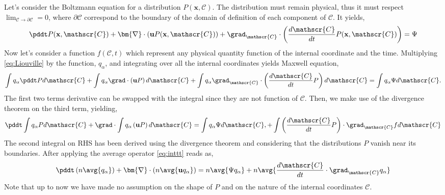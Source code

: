 Let's consider the Boltzmann equation for a distribution $P(\textbf{x},\mathscr{C})$.
The distribution must remain physical, thus it must respect $\lim_{\mathscr{C} \rightarrow \partial\mathscr{C}} = 0$, where $\partial \mathscr{C}$ correspond to the boundary of the domain of definition of each component of $\mathscr{C}$. 
It yields, 
\begin{equation}
    \label{eq:Liouville}
    \pddt P(\textbf{x},\mathscr{C})
    + \bm{\nabla} \cdot \left(\textbf{u} P(\textbf{x},\mathscr{C})\right)
    + \grad_\mathscr{C} \cdot \left(\frac{d\mathscr{C}}{dt} P(\textbf{x},\mathscr{C})\right) 
    = \Psi
\end{equation}
Now let's consider a function $f(\mathscr{C},t)$ which represent any physical quantity function of the internal coordinate and the time. 
Multiplying \ref{eq:Liouville} by the function, $q_\alpha$, and integrating over all the internal coordinates yields Maxwell equation,
\begin{equation}
    \int q_\alpha \pddt P d\mathscr{C}
    + \int q_\alpha \grad \cdot \left(\textbf{u} P\right)d\mathscr{C}
    + \int q_\alpha \grad_\mathscr{C} \cdot \left(\frac{d\mathscr{C}}{dt} P\right) d\mathscr{C} = \int q_\alpha \Psi d\mathscr{C}.
\end{equation}
The first two terms derivative can be swapped with the integral since they are not function of $\mathscr{C}$.
Then, we make use of the divergence theorem on the third term, 
yielding,
\begin{multline}
    \pddt \int q_\alpha  P d\mathscr{C}
    + \grad \cdot\int q_\alpha \left(\textbf{u} P\right)d\mathscr{C} 
    = \int q_\alpha \Psi d\mathscr{C},
    +\int \left(\frac{d\mathscr{C}}{dt} P\right) \cdot \grad_\mathscr{C} f  d\mathscr{C} 
    \label{eq:inttt}
\end{multline}
The second integral on RHS has been derived using the divergence theorem and considering that the distributions $P$ vanish near its boundaries. 
After applying the average operator \ref{eq:inttt} reads as,
\begin{equation}
    \pddt \left( n \avg{q_\alpha}\right)
    + \bm{\nabla} \cdot \left(n \avg{\textbf{u} q_\alpha}\right)
    = n \avg{\Psi q_\alpha}
    + n  \avg{\frac{d\mathscr{C}}{dt} \cdot \grad_\mathscr{C} q_\alpha}
    \label{ap:eq:maxwell}
\end{equation}
Note that up to now we have made no assumption on the shape of $P$ and on the nature of the internal coordinates $\mathscr{C}$. 
